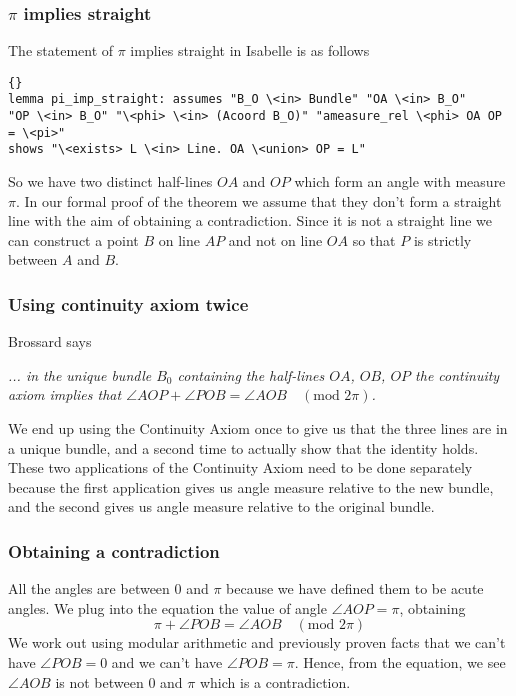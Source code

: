 \documentclass{beamer}
\begin{document}
{\begin{frame}
\end{frame}

\begin{frame}[fragile]
\frametitle{$\pi$ implies straight}
  
  The statement of $\pi$ implies straight in Isabelle is as follows
  
 \begin{lstlisting}[language=Isar, mathescape = true]{}    
lemma pi_imp_straight: assumes "B_O \<in> Bundle" "OA \<in> B_O" 
"OP \<in> B_O" "\<phi> \<in> (Acoord B_O)" "ameasure_rel \<phi> OA OP = \<pi>" 
shows "\<exists> L \<in> Line. OA \<union> OP = L" 
\end{lstlisting}  
 
So we have two distinct half-lines $OA$ and $OP$ which form an angle with measure $\pi$. In our formal proof of the theorem we assume that they don't form a straight line with the aim of obtaining a contradiction. Since it is not a straight line we can construct a point $B$ on line $AP$ and not on line $OA$ so that $P$ is strictly between $A$ and $B$.
 
\end{frame}
\begin{frame}
\frametitle{Using continuity axiom twice}
Brossard says

\textit{... in the unique bundle $B_0$ containing the half-lines $OA$, $OB$, $OP$ the continuity axiom implies that $\angle AOP + \angle POB = \angle AOB \quad (\text{mod } 2\pi)$.} 

We end up using the Continuity Axiom once to give us that the three lines are in a unique bundle, and a second time to actually show that the identity holds. These two applications of the Continuity Axiom need to be done separately because the first application gives us angle measure relative to the new bundle, and the second gives us angle measure relative to the original bundle.

\end{frame}

{{{\graphicspath{{/Users/Imogen/Desktop/Birkhoff_Presentation/}}
 \begin{frame}
 
 \end{frame}
 }
\begin{frame}
\frametitle{Obtaining a  contradiction}

All the angles are between $0$ and $\pi$ because we have defined them to be acute angles. We plug into the equation the value of angle $\angle AOP = \pi$, obtaining
\begin{equation*}
\pi + \angle POB = \angle AOB \quad (\text{mod } 2\pi)
 \end{equation*}
 We work out using modular arithmetic and previously proven facts that we can't have $\angle POB = 0$ and we can't have $\angle POB = \pi$. Hence, from the equation, we see $\angle AOB$ is not between $0$ and $\pi$ which is a contradiction. 
\end{frame}

}}}
\end{document}
